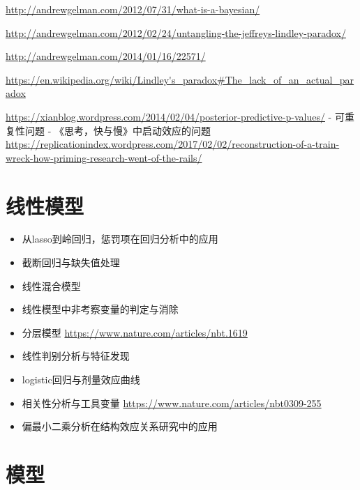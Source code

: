 \documentclass[]{tufte-book}
\providecommand{\tightlist}{%
  \setlength{\itemsep}{0pt}\setlength{\parskip}{0pt}}
\begin{document}
\url{http://andrewgelman.com/2012/07/31/what-is-a-bayesian/}

\url{http://andrewgelman.com/2012/02/24/untangling-the-jeffreys-lindley-paradox/}

\url{http://andrewgelman.com/2014/01/16/22571/}

\url{https://en.wikipedia.org/wiki/Lindley's_paradox\#The_lack_of_an_actual_paradox}

\url{https://xianblog.wordpress.com/2014/02/04/posterior-predictive-p-values/}
- 可重复性问题
- 《思考，快与慢》中启动效应的问题 \url{https://replicationindex.wordpress.com/2017/02/02/reconstruction-of-a-train-wreck-how-priming-research-went-of-the-rails/}

\hypertarget{ux7ebfux6027ux6a21ux578b}{%
\section{线性模型}\label{ux7ebfux6027ux6a21ux578b}}

\begin{itemize}
\tightlist
\item
  从lasso到岭回归，惩罚项在回归分析中的应用
\item
  截断回归与缺失值处理
\item
  线性混合模型
\item
  线性模型中非考察变量的判定与消除
\item
  分层模型 \url{https://www.nature.com/articles/nbt.1619}
\item
  线性判别分析与特征发现
\item
  logistic回归与剂量效应曲线
\item
  相关性分析与工具变量 \url{https://www.nature.com/articles/nbt0309-255}
\item
  偏最小二乘分析在结构效应关系研究中的应用
\end{itemize}

\hypertarget{ux6a21ux578b}{%
\section{模型}\label{ux6a21ux578b}}
\end{document}
